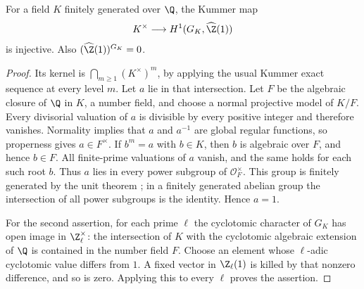 \begin{lemma}\label{A6-kummer}
For a field $K$ finitely generated over $\Q$, the Kummer map
\[
 K^\times\longrightarrow H^1(G_K,\widehat{\Z}(1))
\]
is injective. Also $(\widehat{\Z}(1))^{G_K}=0$.
\end{lemma}
\begin{proof}
Its kernel is $\bigcap_{m\ge1}(K^\times)^m$, by applying the usual Kummer exact sequence at every level $m$. Let $a$ lie in that intersection. Let $F$ be the algebraic closure of $\Q$ in $K$, a number field, and choose a normal projective model of $K/F$. Every divisorial valuation of $a$ is divisible by every positive integer and therefore vanishes. Normality implies that $a$ and $a^{-1}$ are global regular functions, so properness gives $a\in F^\times$. If $b^m=a$ with $b\in K$, then $b$ is algebraic over $F$, and hence $b\in F$. All finite-prime valuations of $a$ vanish, and the same holds for each such root $b$. Thus $a$ lies in every power subgroup of $\mathcal O_F^\times$. This group is finitely generated by the unit theorem \cite[Theorem 5.1]{MilneANTA567}; in a finitely generated abelian group the intersection of all power subgroups is the identity. Hence $a=1$.

For the second assertion, for each prime $\ell$ the cyclotomic character of $G_K$ has open image in $\Z_\ell^\times$: the intersection of $K$ with the cyclotomic algebraic extension of $\Q$ is contained in the number field $F$. Choose an element whose $\ell$-adic cyclotomic value differs from $1$. A fixed vector in $\Z_\ell(1)$ is killed by that nonzero difference, and so is zero. Applying this to every $\ell$ proves the assertion.
\end{proof}

